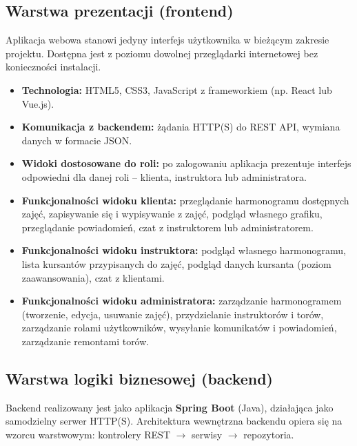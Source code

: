 \documentclass[a4paper,12pt]{article}
\begin{document}
\subsection{Warstwa prezentacji (frontend)}
 
Aplikacja webowa stanowi jedyny interfejs użytkownika w bieżącym zakresie projektu. Dostępna jest z poziomu dowolnej przeglądarki internetowej bez konieczności instalacji.
 
\begin{itemize}
    \item \textbf{Technologia:} HTML5, CSS3, JavaScript z frameworkiem (np. React lub Vue.js).
    \item \textbf{Komunikacja z backendem:} żądania HTTP(S) do REST API, wymiana danych w formacie JSON.
    \item \textbf{Widoki dostosowane do roli:} po zalogowaniu aplikacja prezentuje interfejs odpowiedni dla danej roli -- klienta, instruktora lub administratora.
    \item \textbf{Funkcjonalności widoku klienta:} przeglądanie harmonogramu dostępnych zajęć, zapisywanie się i wypisywanie z zajęć, podgląd własnego grafiku, przeglądanie powiadomień, czat z instruktorem lub administratorem.
    \item \textbf{Funkcjonalności widoku instruktora:} podgląd własnego harmonogramu, lista kursantów przypisanych do zajęć, podgląd danych kursanta (poziom zaawansowania), czat z klientami.
    \item \textbf{Funkcjonalności widoku administratora:} zarządzanie harmonogramem (tworzenie, edycja, usuwanie zajęć), przydzielanie instruktorów i torów, zarządzanie rolami użytkowników, wysyłanie komunikatów i powiadomień, zarządzanie remontami torów.
\end{itemize}
 
\subsection{Warstwa logiki biznesowej (backend)}
 
Backend realizowany jest jako aplikacja \textbf{Spring Boot} (Java), działająca jako samodzielny serwer HTTP(S). Architektura wewnętrzna backendu opiera się na wzorcu warstwowym: kontrolery REST $\rightarrow$ serwisy $\rightarrow$ repozytoria.
 
\end{document}
